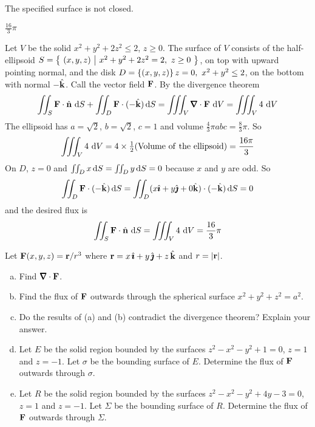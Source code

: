 \begin{hint} 
The specified surface is not closed.
\end{hint}

\begin{answer} 
$\frac{16}{3}\pi$
\end{answer}

\begin{solution} 
 Let $V$ be the solid $x^2+y^2+2z^2\le 2$,
$z\ge 0$. The surface of $V$ consists of the half-ellipsoid
$S=\big\{ \ (x,y,z)\ \big|\ x^2+y^2+2z^2=2,\ z\ge 0\ \big\}$, on top with upward pointing normal,
and the disk $D=\left\{(x,y,z)\right\}{z=0,\ x^2+y^2\le 2}$, on the bottom with 
normal $-\hat{\mathbf{k}}$.
Call the vector field $\mathbf{F}$. By the divergence theorem
$$
\dblInt_S\vF\cdot\hn\ \dee{S}
+\dblInt_D\vF\cdot(-\hk)\,\dee{S}
=\tripInt_V\vnabla\cdot\vF\ \dee{V}
=\tripInt_V 4\ \dee{V}
$$
The ellipsoid has $a=\sqrt{2}$, $b=\sqrt{2}$, $c=1$ and volume 
$\frac{4}{3}\pi abc=\frac{8}{3}\pi$. So 
$$
\iiint_V 4\ \mathrm{d}V=4\times\tfrac{1}{2}({\rm Volume\ of\ the\ ellipsoid})=\frac{16\pi}{3}
$$
On $D$, $z=0$ and $\iint_D x\,\mathrm{d}S=\iint_D y\,\mathrm{d}S=0$
because $x$ and $y$ are odd.
So
$$
\iint_D\mathbf{F}\cdot(-\hat{\mathbf{k}})\,\mathrm{d}S
=\iint_D(x\hat{\pmb{\imath}}+y\hat{\pmb{\jmath}}+0\hat{\mathbf{k}})\cdot(-\hat{\mathbf{k}})\,\mathrm{d}S
=0
$$
and the desired flux is 
$$
\dblInt_S\vF\cdot\hn\ \dee{S}=\tripInt_V 4\ \dee{V}
=\frac{16}{3}\pi
$$
\end{solution}

\begin{question}[M317 2010A] %
Let $\mathbf{F}(x,y,z) = \mathbf{r}/r^3$ where $\mathbf{r}= x\,\hat{\pmb{\imath}} + y\,\hat{\pmb{\jmath}} + z\,\hat{\mathbf{k}}$ and 
$r = |\mathbf{r}|$.
\begin{enumerate}[(a)]
\item
Find $\vnabla \cdot \vF$.
\item
Find the flux of $\mathbf{F}$ outwards through the spherical surface 
$x^2 + y^2 + z^2 = a^2$.
\item
Do the results of (a) and (b) contradict the divergence theorem? Explain your
answer.
\item
Let $E$ be the solid region bounded by the surfaces 
$z^2 - x^2 - y^2 + 1 = 0$, $z = 1$ and $z = -1$. Let $\sigma$ be 
the bounding surface of $E$. Determine the flux of $\mathbf{F}$
outwards through $\sigma$.
\item
Let $R$ be the solid region bounded by the surfaces
$z^2 - x^2 - y^2 + 4y - 3 = 0$, $z = 1$ and $z = - 1$. Let $\Sigma$ 
be the bounding surface of $R$. Determine the flux of $\mathbf{F}$ 
outwards through $\Sigma$.
\end{enumerate}
\end{question}

